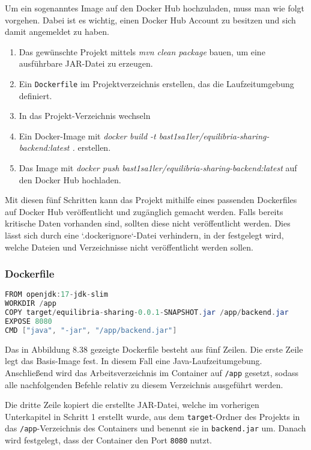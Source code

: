 	\vspace{3mm} \noindent
	Um ein sogenanntes Image auf den Docker Hub hochzuladen, muss man wie folgt vorgehen. Dabei ist es wichtig, einen Docker Hub Account zu besitzen und sich damit angemeldet zu haben.
	
	\begin{enumerate}
		\item Das gewünschte Projekt mittels \textit{mvn clean package} bauen, um eine ausführbare JAR-Datei zu erzeugen.
		\item Ein \texttt{Dockerfile} im Projektverzeichnis erstellen, das die Laufzeitumgebung definiert.
		\item In das Projekt-Verzeichnis wechseln
		\item Ein Docker-Image mit \textit{docker build -t bast1sa1ler/equilibria-sharing-backend:latest .} erstellen.
		\item Das Image mit \textit{docker push bast1sa1ler/equilibria-sharing-backend:latest} auf den Docker Hub hochladen.
	\end{enumerate}
	
	\noindent Mit diesen fünf Schritten kann das Projekt mithilfe eines passenden Dockerfiles auf Docker Hub veröffentlicht und zugänglich gemacht werden. Falls bereits kritische Daten vorhanden sind, sollten diese nicht veröffentlicht werden. Dies lässt sich durch eine `.dockerignore`-Datei verhindern, in der festgelegt wird, welche Dateien und Verzeichnisse nicht veröffentlicht werden sollen. 
	
	\subsubsection{Dockerfile}
	
	\begin{lstlisting}[language=Java, caption={Beispiel Dockerfile \cite{ChatGPT:docker}.}]
FROM openjdk:17-jdk-slim
WORKDIR /app
COPY target/equilibria-sharing-0.0.1-SNAPSHOT.jar /app/backend.jar
EXPOSE 8080
CMD ["java", "-jar", "/app/backend.jar"]
	\end{lstlisting}
	
	\noindent Das in Abbildung 8.38 gezeigte Dockerfile besteht aus fünf Zeilen. Die erste Zeile legt das Basis-Image fest. In diesem Fall eine Java-Laufzeitumgebung. Anschließend wird das Arbeitsverzeichnis im Container auf \texttt{/app} gesetzt, sodass alle nachfolgenden Befehle relativ zu diesem Verzeichnis ausgeführt werden.  
	
	\noindent Die dritte Zeile kopiert die erstellte JAR-Datei, welche im vorherigen Unterkapitel in Schritt 1 erstellt wurde, aus dem \texttt{target}-Ordner des Projekts in das \texttt{/app}-Verzeichnis des Containers und benennt sie in \texttt{backend.jar} um. Danach wird festgelegt, dass der Container den Port \texttt{8080} nutzt.
	
